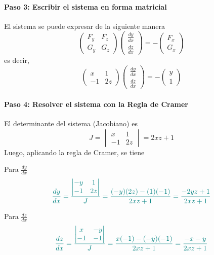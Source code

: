 \documentclass{article}
\begin{document}
\paragraph{\color{teal}Paso 3: Escribir el sistema en forma matricial}  
El sistema se puede expresar de la siguiente manera
\[
\begin{pmatrix}
F_y & F_z \\
G_y & G_z
\end{pmatrix}
\begin{pmatrix}
\frac{dy}{dx} \\
\frac{dz}{dx}
\end{pmatrix}
=
-\begin{pmatrix}
F_x \\
G_x
\end{pmatrix}
\]
es decir,
\[
\begin{pmatrix}
x & 1 \\
-1 & 2z
\end{pmatrix}
\begin{pmatrix}
\frac{dy}{dx} \\
\frac{dz}{dx}
\end{pmatrix}
=
-\begin{pmatrix}
y \\
1
\end{pmatrix}
\]

\paragraph{\color{teal}Paso 4: Resolver el sistema con la Regla de Cramer}  
El determinante del sistema (Jacobiano) es
\[
J = \begin{vmatrix}
x & 1 \\
-1 & 2z
\end{vmatrix} = 2xz + 1
\]
Luego, aplicando la regla de Cramer, se tiene

Para \( \displaystyle \frac{dy}{dx} \)
\[\color{teal}
\frac{dy}{dx} =
\frac{
\begin{vmatrix}
-y & 1 \\
-1 & 2z
\end{vmatrix}
}{J}
=
\frac{(-y)(2z) - (1)(-1)}{2xz+1}
=
\frac{-2yz+1}{2xz+1}
\]

Para \( \displaystyle \frac{dz}{dx} \)
\[\color{teal}
\frac{dz}{dx} =
\frac{
\begin{vmatrix}
x & -y \\
-1 & -1
\end{vmatrix}
}{J}
=
\frac{x(-1)-(-y)(-1)}{2xz+1}
=
\frac{-x-y}{2xz+1}
\]
\end{document}
